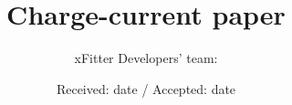 \documentclass[pdftex,twocolumn,epjc3]{svjour3}          %
\begin{document}
\sloppy

\title{Charge-current paper}


\author{xFitter Developers' team:
}


\date{Received: date / Accepted: date}

\maketitle

\begin{abstract}

\end{abstract}
\end{document}
